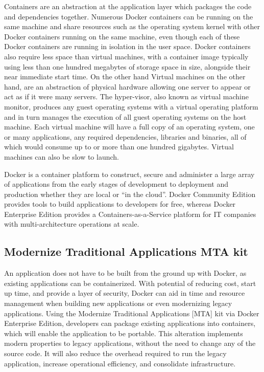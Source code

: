 Containers are an abstraction at the application layer which packages the code and dependencies  together. Numerous Docker containers can be running on the same machine and share resources such as the operating system kernel with other Docker containers running on the same machine, even though each of these Docker containers are running in isolation in the user space. Docker containers also require less space than virtual machines, with a container image typically using less than one hundred megabytes of storage space in size, alongside their near immediate start time.
On the other hand Virtual machines on the other hand, are an abstraction of physical hardware allowing one server to appear or act as if it were many servers. The hyper-visor, also known as virtual machine monitor, produces any guest operating systems with a virtual operating platform and in turn manages the execution of all guest operating systems on the host machine. Each virtual machine will have a full copy of an operating system, one or many applications, any required dependencies, libraries and binaries, all of which would consume up to or more than one hundred gigabytes. Virtual machines can also be slow to launch. 

Docker is a container platform to construct, secure and administer a large array of applications from the early stages of development to deployment and production whether they are local or “in the cloud”. Docker Community Edition provides tools to build applications to developers for free, whereas Docker Enterprise Edition provides a Containers-as-a-Service platform for IT companies with multi-architecture operations at scale. 

\subsection{Modernize Traditional Applications MTA kit}
An application does not have to be built from the ground up with Docker, as existing applications  can be containerized. With potential of reducing cost, start up time, and provide a layer of security, Docker can aid in time and resource management when building new applications or even modernizing legacy applications. Using the Modernize Traditional Applications [MTA] kit via Docker Enterprise Edition, developers can package existing applications into containers, which will enable the application to be portable. This alteration implements modern properties to legacy applications, without the need to change any of the source code. It will also reduce the overhead required to run the legacy application, increase operational efficiency, and consolidate infrastructure.

